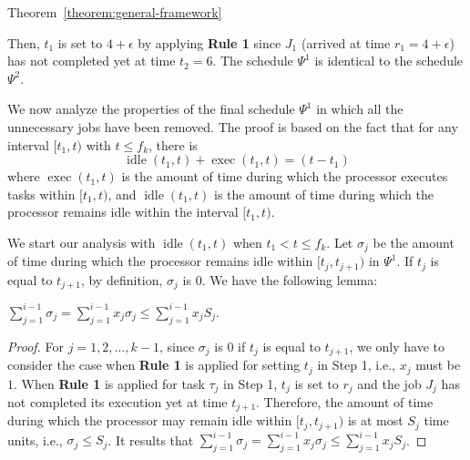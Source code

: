 \begin{appProof}{Theorem~\ref{theorem:general-framework}}
\begin{example}
Then, $t_1$ is set to $4+\epsilon$ by applying {\bf Rule 1} since
$J_1$ (arrived at time $r_1=4+\epsilon$) has not completed yet at time
$t_2=6$.  The schedule $\Psi^1$ is identical to the schedule
$\Psi^2$.
\myendproof
\end{example}


We now analyze the properties of the final schedule $\Psi^1$ in which all the unnecessary jobs have been removed. 
The proof is based on the fact that for any interval $[t_1, t)$ with $t \leq f_k$, there is 
\begin{equation}
\label{eq:exec_plus_idle}
\operatorname{idle}(t_1, t) + \operatorname{exec}(t_1, t)  = (t - t_1)
\end{equation}
where $\operatorname{exec}(t_1, t)$ is the amount of time during which the processor executes tasks within $[t_1, t)$, and $\operatorname{idle}(t_1, t)$ is the amount of time during which the processor remains idle within the interval $[t_1, t)$.





We start our analysis with $\operatorname{idle}(t_1, t)$ when $t_1 < t \leq f_k$.
Let $\sigma_j$ be the amount of time during which the processor remains idle within $[t_j, t_{j+1})$ in $\Psi^1$. If $t_j$ is equal to $t_{j+1}$, by definition, $\sigma_j$ is $0$.
We have the following lemma:
\begin{Lemma}
\label{lem:max_idle}
$\sum_{j=1}^{i-1} \sigma_j  = \sum_{j=1}^{i-1} x_j \sigma_j\leq \sum_{j=1}^{i-1} x_j S_j$. %
\end{Lemma}
\begin{proof}
  For $j=1,2,\ldots,k-1$, 
  since $\sigma_j$ is $0$ if $t_j$ is equal to $t_{j+1}$, we only have
  to consider the case when {\bf Rule 1} is applied for setting $t_j$
  in Step 1, i.e., $x_j$ must be $1$.  When {\bf Rule 1} is applied for task $\tau_j$ in Step 1, $t_j$ is set to $r_j$ and
  the job $J_j$ has not completed its execution yet at time $t_{j+1}$. Therefore, the
  amount of time during which the processor may remain idle within
  $[t_j, t_{j+1})$ is at most $S_j$ time units, i.e., $\sigma_j \leq S_j$.   It results that
  $\sum_{j=1}^{i-1} \sigma_j = \sum_{j=1}^{i-1} x_j \sigma_j \leq
  \sum_{j=1}^{i-1} x_j S_j$.
\end{proof}


\end{appProof}
